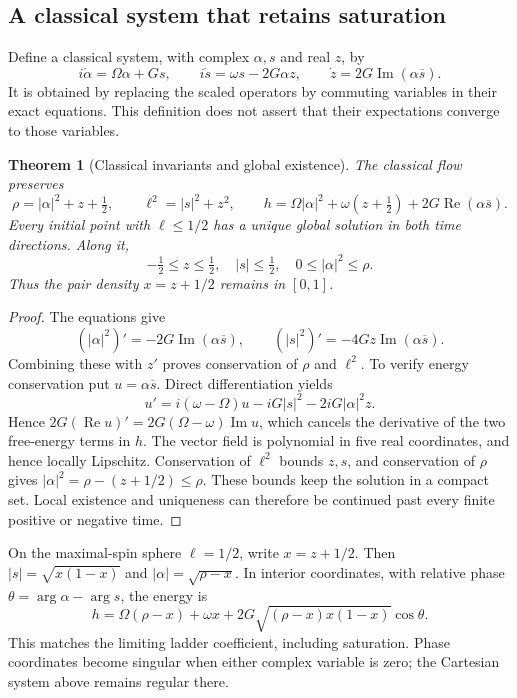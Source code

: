 \documentclass[11pt]{article}
\newtheorem{theorem}{Theorem}[section]
\theoremstyle{remark}
\begin{document}
\subsection{A classical system that retains saturation}

Define a classical system, with complex \(\alpha,s\) and real \(z\), by
\[
 i\dot\alpha=\Omega\alpha+Gs,\qquad
 i\dot s=\omega s-2G\alpha z,\qquad
 \dot z=2G\operatorname{Im}(\alpha\overline s).
\]
It is obtained by replacing the scaled operators by commuting
variables in their exact equations.  This definition does not
assert that their expectations converge to those variables.

\begin{theorem}[Classical invariants and global existence]
\label{thm:v20v59-classical}
The classical flow preserves
\[
 \rho=|\alpha|^2+z+\tfrac12,\qquad
 \ell^2=|s|^2+z^2,\qquad
 h=\Omega|\alpha|^2+\omega(z+\tfrac12)
                     +2G\operatorname{Re}(\alpha\overline s).
\]
Every initial point with \(\ell\leq1/2\) has a unique
global solution in both time directions.  Along it,
\[
 -\tfrac12\leq z\leq\tfrac12,\quad |s|\leq\tfrac12,\quad
 0\leq|\alpha|^2\leq\rho .
\]
Thus the pair density \(x=z+1/2\) remains in \([0,1]\).
\end{theorem}
\begin{proof}
The equations give
\[
 (|\alpha|^2)'=-2G\operatorname{Im}(\alpha\overline s),
 \qquad
 (|s|^2)'=-4Gz\operatorname{Im}(\alpha\overline s).
\]
Combining these with \(z'\) proves conservation of \(\rho\)
and \(\ell^2\).  To verify energy conservation put
\(u=\alpha\overline s\).  Direct differentiation yields
\[
 u'=i(\omega-\Omega)u-iG|s|^2-2iG|\alpha|^2z.
\]
Hence \(2G(\operatorname{Re}u)'=
2G(\Omega-\omega)\operatorname{Im}u\), which cancels
the derivative of the two free-energy terms in \(h\).
The vector field is polynomial in five real coordinates,
and hence locally Lipschitz.  Conservation of \(\ell^2\)
bounds \(z,s\), and conservation of \(\rho\) gives
\(|\alpha|^2=\rho-(z+1/2)\leq\rho\).
These bounds keep the solution in a compact set.  Local
existence and uniqueness can therefore be continued
past every finite positive or negative time.
\end{proof}

On the maximal-spin sphere \(\ell=1/2\), write
\(x=z+1/2\).  Then \(|s|=\sqrt{x(1-x)}\) and
\(|\alpha|=\sqrt{\rho-x}\).  In interior coordinates,
with relative phase \(\theta=\arg\alpha-\arg s\), the
energy is
\[
 h=\Omega(\rho-x)+\omega x+
               2G\sqrt{(\rho-x)x(1-x)}\cos\theta .
\]
This matches the limiting ladder coefficient, including
saturation.  Phase coordinates become singular when
either complex variable is zero; the Cartesian system
above remains regular there.
\end{document}
